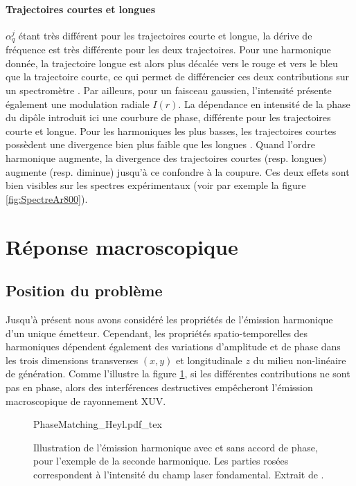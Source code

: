 \paragraph{Trajectoires courtes et longues} $\alpha_q^j$ étant très différent pour les trajectoires courte et longue, la dérive de fréquence est très différente pour les deux trajectoires. Pour une harmonique donnée, la trajectoire longue est alors plus décalée vers le rouge et vers le bleu que la trajectoire courte, ce qui permet de différencier ces deux contributions sur un spectromètre . Par ailleurs, pour un faisceau gaussien, l'intensité présente également une modulation radiale $I(r)$. La dépendance en intensité de la phase du dipôle introduit ici une courbure de phase, différente pour les trajectoires courte et longue. Pour les harmoniques les plus basses, les trajectoires courtes possèdent une divergence bien plus faible que les longues . Quand l'ordre harmonique augmente, la divergence des trajectoires courtes (resp. longues) augmente (resp. diminue) jusqu'à ce confondre à la coupure. Ces deux effets sont bien visibles sur les spectres expérimentaux (voir par exemple la figure \ref{fig:SpectreAr800}).

\section{Réponse macroscopique}
\label{sec:AccordDePhase}
\subsection{Position du problème}
Jusqu'à présent nous avons considéré les propriétés de l'émission harmonique d'un unique émetteur. Cependant, les propriétés spatio-temporelles des harmoniques dépendent également des variations d'amplitude et de phase dans les trois dimensions transverses $(x,y)$ et longitudinale $z$ du milieu non-linéaire de génération. Comme l'illustre la figure \ref{fig:PhaseMatchingHeyl}, si les différentes contributions ne sont pas en phase, alors des interférences destructives empêcheront l'émission macroscopique de rayonnement XUV.

\begin{figure}[ht]
\centering
\def\svgwidth{0.7\columnwidth}
{PhaseMatching_Heyl.pdf_tex}
\caption{Illustration de l'émission harmonique avec et sans accord de phase, pour l'exemple de la seconde harmonique. Les parties rosées correspondent à l'intensité du champ laser fondamental. Extrait de .}
\label{fig:PhaseMatchingHeyl}
\end{figure}

